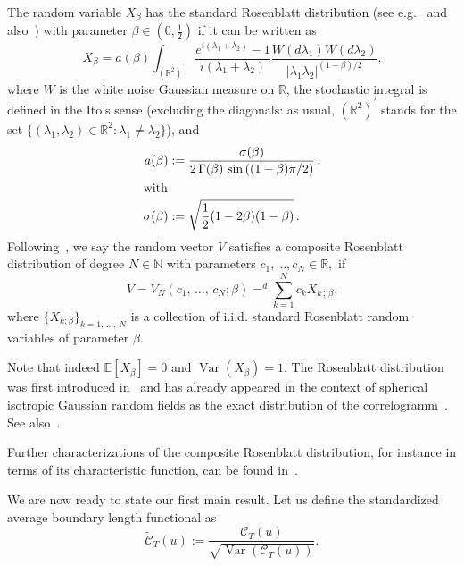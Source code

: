 \documentclass[AHL,Unicode,longabstracts,published]{cedram}
\newcommand{\clC}{\mathcal{C}}
\newcommand{\bbR}{\mathbb{R}}
\newcommand{\bbE}{\mathbb{E}}
\newcommand{\bbN}{\mathbb{N}}
\DeclareMathOperator{\Var}{Var}
\begin{document}
\begin{defi}
The random variable $X_\beta$ has the standard Rosenblatt distribution (see e.g.~\cite{Ta:75} and also~\cite{DM79,Ta:79}) with parameter $\beta \in (0,
\frac{1}{2})$ if it can be written as
\begin{equation}\label{Xbeta}
X_{\beta}=a(\beta) \int_{(\bbR^{2})^{^{\prime }}}\frac{e^{i(\lambda _{1}+\lambda _{2})}-1}{i(\lambda _{1}+\lambda _{2})}\frac{W(d\lambda _{1})W(d\lambda _{2})}{|\lambda _{1}\lambda _{2}|^{(1-\beta)/2}}\text{,}
\end{equation}
where $W$ is the white noise Gaussian measure on $\bbR$, the stochastic integral is defined in the Ito's sense (excluding the diagonals: as usual, $(\bbR^2)^{\prime }$ stands for the set $\{ (\lambda_1,
\lambda_2)\in \bbR^2:\lambda_1 \ne \lambda_2\}$), and
\begin{align}
a(\beta) &:= \frac{\sigma(\beta)}{2\,\Gamma(\beta)\,\sin\left({(1-\beta)\pi}/{ 2}\right)}\,,\label{abeta}
\\
\intertext{with}
\sigma(\beta) &:= \sqrt{\frac12(1-2\beta)(1-\beta)}\,.\nonumber
\end{align}
Following~\cite{MRV:20}, we say the random vector $V$ satisfies a composite Rosenblatt distribution of degree $N\in \bbN$ with parameters $ c_{1},\dots,c_{N}\in \bbR,$ if
\begin{equation}\label{V}
V=V_{N}(c_{1},\,\dots,\,c_{N};\beta)\mathop{=}^d\sum_{k=1}^{N}c_{k}X_{k\,;\,\beta}
\text{,}
\end{equation}
where $\{ X_{k;\beta}\} _{k=1,\,\dots,\,N}$ is a collection of i.i.d. standard Rosenblatt random variables of parameter $\beta $.
\end{defi}

Note that indeed $\bbE[X_\beta]=0$ and $\Var(X_\beta)=1$. The Rosenblatt distribution was first introduced in~\cite{Ta:75} and has already appeared in the context of spherical isotropic Gaussian random fields as the exact distribution of the correlogramm~\cite{LTT18}. See also~\cite{Leo88, LRT17,VT13}.

Further characterizations of the composite Rosenblatt distribution, for instance in terms of its characteristic function, can be found in~\cite {MRV:20}.

We are now ready to state our first main result. Let us define the standardized average boundary length functional as
\begin{equation}
\widetilde{\clC}_{T}(u):=\frac{\clC_{T}(u)}{\sqrt{\Var\left(\clC_{T}(u)\right)}}.
\end{equation}
\end{document}
